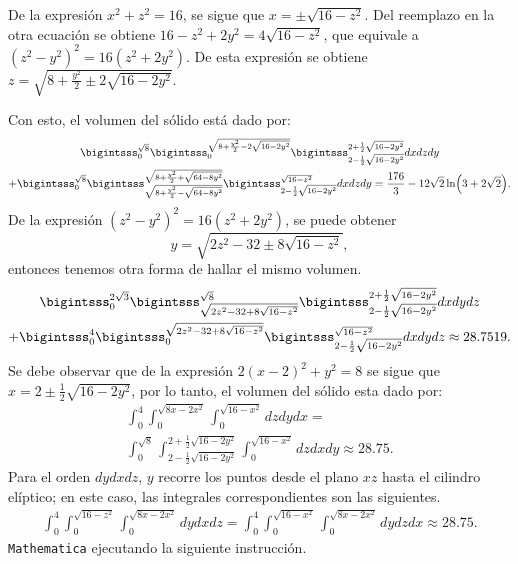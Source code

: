 \enlargethispage*{\baselineskip}

De la expresión $x^2+z^2=16$, se sigue que $x=\pm \sqrt{16-z^2}$. Del reemplazo en la otra ecuación se obtiene $16-z^2+2y^2=4\sqrt{16-z^2}$, que equivale a $\left( z^2-y^2\right) ^2=16\left( z^2+2y^2\right)$. De esta expresión se obtiene $z=\sqrt{8+\frac{y^2}{2}\pm 2\sqrt{16-2y^2}}$.

Con esto, el volumen del sólido está dado por:
\begin{gather*}
\bigintsss_{0}^{\sqrt{8}}\bigintsss_{0}^{\sqrt{8+\frac{y^2}{2}-2\sqrt{16-2y^2}}}\bigintsss_{2-\frac{1}{2}\sqrt{16-2y^2}}^{2+\frac{1}{2}\sqrt{16-2y^2}}dxdzdy \\
+\bigintsss_{0}^{\sqrt{8}}\bigintsss_{\sqrt{8+\frac{y^2}{2}-\sqrt{64-8y^2}}}^{\sqrt{8+\frac{y^2}{2}+\sqrt{64-8y^2}}}\bigintsss_{2-\frac{1}{2}\sqrt{16-2y^2}}^{\sqrt{16-z^2}}dxdzdy = \frac{176}{3}-12\sqrt{2}\ln( 3+2\sqrt{2}).
\end{gather*}
De la expresión $\left( z^2-y^2\right) ^2=16\left( z^2+2y^2\right)$, se puede obtener
\[y=\sqrt{2z^2-32\pm 8\sqrt{16-z^2}},\]
entonces tenemos otra forma de hallar el mismo volumen.
\begin{multline*}
\bigintsss_{0}^{2\sqrt{3}}\bigintsss_{\sqrt{2z^2-32+8\sqrt{16-z^2}}}^{\sqrt{8}}\bigintsss_{2-\frac{1}{2}\sqrt{16-2y^2}}^{2+\frac{1}{2}\sqrt{16-2y^2}}dxdydz \\
+\bigintsss_{0}^{4}\bigintsss_{0}^{\sqrt{2z^2-32+8\sqrt{16-z^2}}}\bigintsss_{2-\frac{1}{2}\sqrt{16-2y^2}}^{\sqrt{16-z^2}}dxdydz \approx 28.7519.
\end{multline*}
Se debe observar que de la expresión $2( x-2) ^2+y^2=8$ se sigue que $x=2\pm \frac{1}{2}\sqrt{16-2y^2}$,
por lo tanto, el volumen del sólido esta dado por:
\begin{multline*}
\int_{0}^{4}\int_{0}^{\sqrt{8x-2x^2}}\int_{0}^{\sqrt{16-x^2}}dzdydx = \\
\int_{0}^{\sqrt{8}}\int_{2-\frac{1}{2}\sqrt{16-2y^2}}^{2+\frac{1}{2}\sqrt{16-2y^2}}\int_{0}^{\sqrt{16-x^2}}dzdxdy \approx 28.75.
\end{multline*}
Para el orden $dydxdz$, $y$ recorre los puntos desde el plano $xz$ hasta el cilindro elíptico; en este caso, las integrales correspondientes son las \mbox{siguientes}.
\begin{gather*}
\int_{0}^{4}\int_{0}^{\sqrt{16-z^2}}\int_{0}^{\sqrt{8x-2x^2}}dydxdz =\int_{0}^{4}\int_{0}^{\sqrt{16-x^2}}\int_{0}^{\sqrt{8x-2x^2}}dydzdx \approx 28.75.
\end{gather*}
 \verb"Mathematica" ejecutando la siguiente instrucción.

